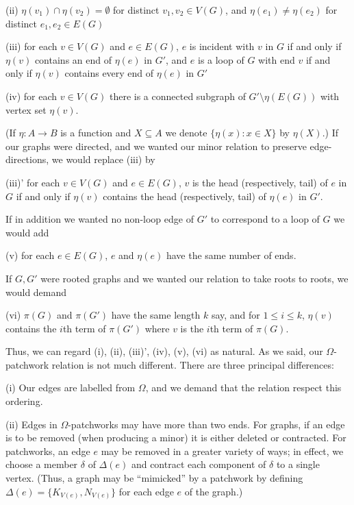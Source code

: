 \hspace*{12pt}(ii) $\eta(v_1) \cap \eta(v_2) = \emptyset$ for distinct $v_1, v_2 \in V(G)$, and $\eta(e_1) \neq \eta(e_2)$ for distinct $e_1, e_2 \in E(G)$

\hspace*{12pt}(iii) for each $v \in V(G)$ and $e \in E(G)$, $e$ is incident with $v$ in $G$ if and only if $\eta(v)$ contains an end of $\eta(e)$ in $G'$, and $e$ is a loop of $G$ with end $v$ if and only if $\eta(v)$ contains every end of $\eta(e)$ in $G'$

\hspace*{12pt}(iv) for each $v \in V(G)$ there is a connected subgraph of $G' \setminus \eta(E(G))$ with vertex set $\eta(v)$.

(If $\eta \colon A \to B$ is a function and $X \subseteq A$ we denote $\{\eta(x) \colon x \in X\}$ by $\eta(X)$.) If our graphs were directed, and we wanted our minor relation to preserve edge-directions, we would replace (iii) by

(iii)' for each $v \in V(G)$ and $e \in E(G)$, $v$ is the head (respectively, tail) of $e$ in $G$ if and only if $\eta(v)$ contains the head (respectively, tail) of $\eta(e)$ in $G'$.

If in addition we wanted no non-loop edge of $G'$ to correspond to a loop of $G$ we would add

\hspace*{12pt}(v) for each $e \in E(G)$, $e$ and $\eta(e)$ have the same number of ends.

If $G, G'$ were rooted graphs and we wanted our relation to take roots to roots, we would demand

\hspace*{12pt}(vi) $\pi(G)$ and $\pi(G')$ have the same length $k$ say, and for $1 \le i \le k$, $\eta(v)$ contains the $i$th term of $\pi(G')$ where $v$ is the $i$th term of $\pi(G)$.

Thus, we can regard (i), (ii), (iii)', (iv), (v), (vi) as natural. As we said, our $\Omega$-patchwork relation is not much different. There are three principal differences:

\hspace*{12pt}(i) Our edges are labelled from $\Omega$, and we demand that the relation respect this ordering.

\hspace*{12pt}(ii) Edges in $\Omega$-patchworks may have more than two ends. For graphs, if an edge is to be removed (when producing a minor) it is either deleted or contracted. For patchworks, an edge $e$ may be removed in a greater variety of ways; in effect, we choose a member $\delta$ of $\Delta(e)$ and contract each component of $\delta$ to a single vertex. (Thus, a graph may be ``mimicked'' by a patchwork by defining $\Delta(e) = \{K_{V(e)}, N_{V(e)}\}$ for each edge $e$ of the graph.)

